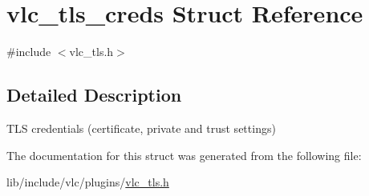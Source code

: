 \hypertarget{structvlc__tls__creds}{}\section{vlc\+\_\+tls\+\_\+creds Struct Reference}
\label{structvlc__tls__creds}


{\ttfamily \#include $<$vlc\+\_\+tls.\+h$>$}



\subsection{Detailed Description}
T\+LS credentials (certificate, private and trust settings) 

The documentation for this struct was generated from the following file\+:\begin{DoxyCompactItemize}
\item 
lib/include/vlc/plugins/\hyperlink{vlc__tls_8h}{vlc\+\_\+tls.\+h}\end{DoxyCompactItemize}
